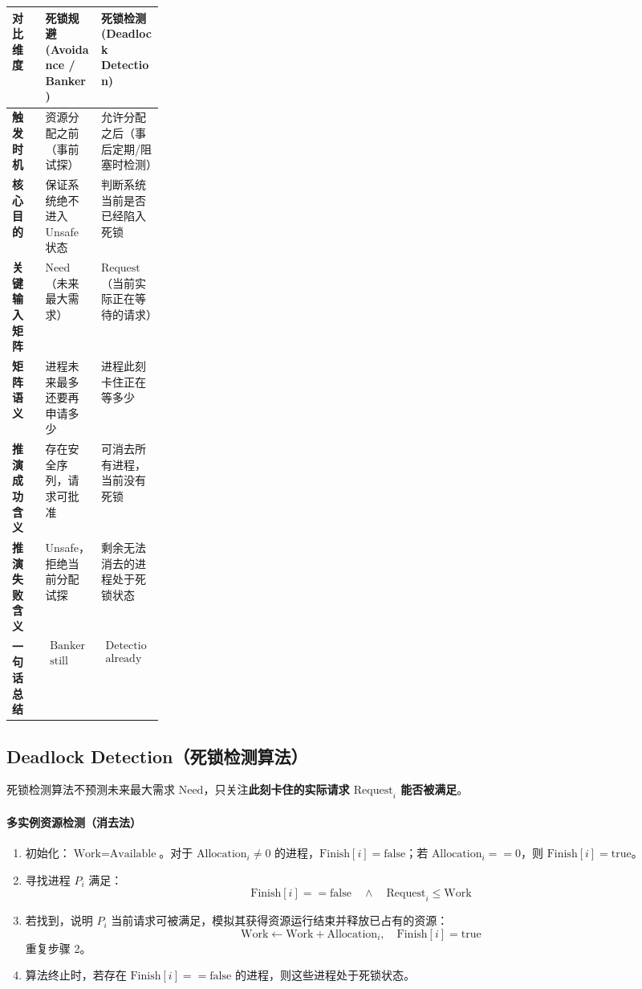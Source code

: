 \documentclass[11pt,a4paper]{ctexart}
\newcommand{\kw}[1]{\textbf{#1}}
\begin{document}
\begingroup
\small
\renewcommand{\arraystretch}{1.25}
\setlength{\tabcolsep}{6pt}
\begin{tabularx}{\linewidth}{>{\bfseries}p{0.22\linewidth} X X}
\toprule
对比维度 & 死锁规避 (Avoidance / Banker) & 死锁检测 (Deadlock Detection)\\
\midrule
触发时机 & 资源分配之前（事前试探） & 允许分配之后（事后定期/阻塞时检测）\\
核心目的 & 保证系统绝不进入 Unsafe 状态 & 判断系统当前是否已经陷入死锁\\
关键输入矩阵 & $\text{Need}$（未来最大需求） & $\text{Request}$（当前实际正在等待的请求）\\
矩阵语义 & 进程未来最多还要再申请多少 & 进程此刻卡住正在等多少\\
推演成功含义 & 存在安全序列，请求可批准 & 可消去所有进程，当前没有死锁\\
推演失败含义 & Unsafe，拒绝当前分配试探 & 剩余无法消去的进程处于死锁状态\\
一句话总结 &
$\boxed{\begin{gathered}\text{Banker: Can everybody}\\\text{still finish?}\end{gathered}}$ &
$\boxed{\begin{gathered}\text{Detection: Who is}\\\text{already unable to finish?}\end{gathered}}$\\
\bottomrule
\end{tabularx}
\endgroup

\subsection{Deadlock Detection（死锁检测算法）}

死锁检测算法不预测未来最大需求 $\text{Need}$，只关注\kw{此刻卡住的实际请求 $\text{Request}_i$ 能否被满足}。

\paragraph{多实例资源检测（消去法）}
\begin{enumerate}
\item 初始化：$\text{Work} = \text{Available}$。对于 $\text{Allocation}_i \neq 0$ 的进程，$\text{Finish}[i] = \text{false}$；若 $\text{Allocation}_i == 0$，则 $\text{Finish}[i] = \text{true}$。
\item 寻找进程 $P_i$ 满足：
\[
\text{Finish}[i] == \text{false} \quad \land \quad \text{Request}_i \le \text{Work}
\]
\item 若找到，说明 $P_i$ 当前请求可被满足，模拟其获得资源运行结束并释放已占有的资源：
\[
\text{Work} \leftarrow \text{Work} + \text{Allocation}_i, \quad \text{Finish}[i] = \text{true}
\]
重复步骤 2。
\item 算法终止时，若存在 $\text{Finish}[i] == \text{false}$ 的进程，则这些进程处于死锁状态。
\end{enumerate}
\end{document}
